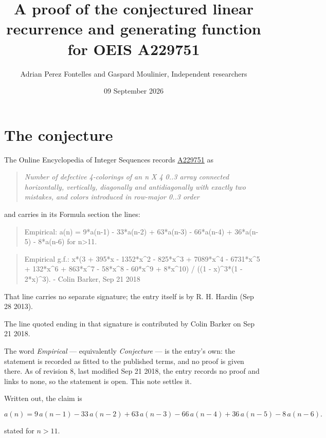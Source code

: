 \documentclass[11pt]{article}
\title{A proof of the conjectured linear recurrence and generating function for OEIS A229751}
\author{Adrian Perez Fontelles and Gaspard Moulinier, Independent researchers}
\date{09 September 2026}
\theoremstyle{definition}
\begin{document}
\maketitle
\section{The conjecture}

The Online Encyclopedia of Integer Sequences records \href{https://oeis.org/A229751}{A229751} as

\begin{quote}\itshape Number of defective 4-colorings of an n X 4 0..3 array connected horizontally, vertically, diagonally and antidiagonally with exactly two mistakes, and colors introduced in row-major 0..3 order\end{quote}

and carries in its Formula section the lines:

\begin{quote}\ttfamily Empirical: a(n) = 9*a(n-1) - 33*a(n-2) + 63*a(n-3) - 66*a(n-4) + 36*a(n-5) - 8*a(n-6) for n>11.\end{quote}

\begin{quote}\ttfamily Empirical g.f.: x*(3 + 395*x - 1352*x\textasciicircum{}2 - 825*x\textasciicircum{}3 + 7089*x\textasciicircum{}4 - 6731*x\textasciicircum{}5 + 132*x\textasciicircum{}6 + 863*x\textasciicircum{}7 - 58*x\textasciicircum{}8 - 60*x\textasciicircum{}9 + 8*x\textasciicircum{}10) / ((1 - x)\textasciicircum{}3*(1 - 2*x)\textasciicircum{}3). - Colin Barker, Sep 21 2018\end{quote}

That line carries no separate signature; the entry itself is by R. H. Hardin (Sep 28 2013).

The line quoted ending in that signature is contributed by Colin Barker on Sep 21 2018.

The word {\itshape Empirical} --- equivalently {\itshape Conjecture} --- is the entry's own: the statement is recorded as fitted to the published terms, and no proof is given there. As of revision 8, last modified Sep 21 2018, the entry records no proof and links to none, so the statement is open. This note settles it.

Written out, the claim is

\[a(n) = 9\,a(n-1) - 33\,a(n-2) + 63\,a(n-3) - 66\,a(n-4) + 36\,a(n-5) - 8\,a(n-6).\]

stated for $n > 11$.
\end{document}
